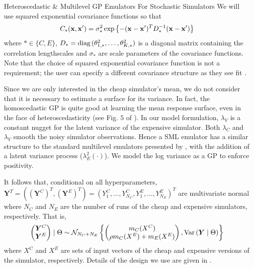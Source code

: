 \begin{chapter}{Heteroscedastic \& Multilevel GP Emulators For Stochastic Simulators\label{Ch:Hetsml}}
We will use squared exponential covariance functions so that
\begin{equation*}
 C_{*}(\mathbf{x}, \mathbf{x}') = \sigma^2_{*} \exp\left\{ -(\mathbf{x} - \mathbf{x}')^T D^{-1}_{*}(\mathbf{x} - \mathbf{x}')\right\}
\end{equation*}
where $* \in \{C, E\}$, $D_{*} = \text{diag}\,(\theta_{1, *}^2, \ldots, \theta_{K, *}^2)$ is a diagonal matrix containing the correlation lengthscales and $\sigma_*$ are scale parameters of the covariance functions. Note that the choice of squared exponential covariance function is not a requirement; the user can specify a different covariance structure as they see fit \citep{Rasmussen2006Gpfm}.

Since we are only interested in the cheap simulator's mean, we do not consider that it is necessary to estimate a surface for its variance. In fact, the homoscedastic GP is quite good at learning the mean response surface, even in the face of heteroscedasticity (see Fig. $5$ of \cite{Binois2019}). In our model formulation, $\lambda_{V}$ is a constant nugget for the latent variance of the expensive simulator. Both $\lambda_C$ and $\lambda_V$ smooth the noisy simulator observations. Hence a SML emulator has a similar structure to the standard multilevel emulators presented by \cite{Kennedy2000}, with the addition of a latent variance process ($\lambda_E^2(\cdot)$). We model the log variance as a GP to enforce positivity.

It follows that, conditional on all hyperparameters,\newline $\bm{Y}^T = \left( (\bm{Y}^C)^T, (\bm{Y}^E)^T \right)= (Y^C_1, \ldots, Y^C_{N_C}, Y^E_1, \ldots, Y^E_{N_E})^T$ are multivariate normal where $N_C$ and $N_E$ are the number of runs of the cheap and expensive simulators, respectively. That is,
\begin{equation}
\begin{pmatrix} \bm{Y}^C \\ \bm{Y}^E \end{pmatrix} \mid \Theta \sim \mathcal{N}_{N_C + N_E} \left\{ \begin{pmatrix} m_C(X^C) \\ \rho m_C(X^E) + m_E(X^E) \end{pmatrix}, \mathrm{Var}\,(\bm{Y}\mid \Theta)\right\}
\end{equation}
where $X^C$ and $X^E$ are sets of input vectors of the cheap and expensive versions of the simulator, respectively. Details of the design we use are given in .


\end{chapter}
